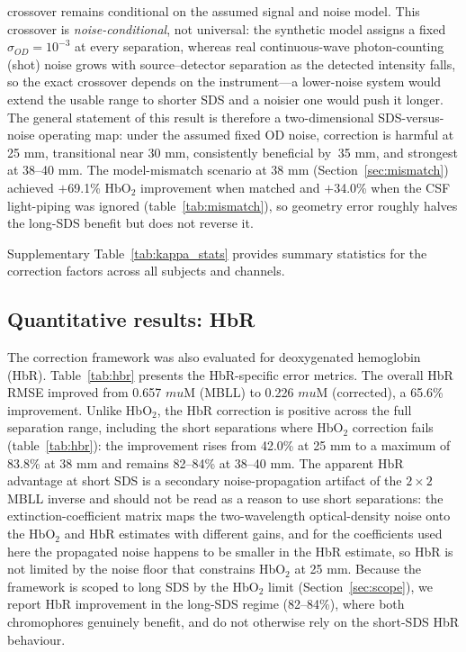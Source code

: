 \documentclass[11pt]{article}
\def\mu{mu}%
\def\sim{~}%
\def\mathrm#1{#1}%
\def\,{ }%
\begin{document}
crossover remains conditional on the assumed signal and noise model. This crossover is \emph{noise-conditional}, not universal: the synthetic model assigns a fixed $\sigma_{\mathrm{OD}}=10^{-3}$ at every separation, whereas real continuous-wave photon-counting (shot) noise grows with source--detector separation as the detected intensity falls, so the exact crossover depends on the instrument---a lower-noise system would extend the usable range to shorter SDS and a noisier one would push it longer. The general statement of this result is therefore a two-dimensional SDS-versus-noise operating map: under the assumed fixed OD noise, correction is harmful at 25\,mm, transitional near 30\,mm, consistently beneficial by $\sim$35\,mm, and strongest at 38--40\,mm. The model-mismatch scenario at 38\,mm (Section~\ref{sec:mismatch}) achieved $+$69.1\% HbO$_2$ improvement when matched and $+$34.0\% when the CSF light-piping was ignored (table~\ref{tab:mismatch}), so geometry error roughly halves the long-SDS benefit but does not reverse it.



Supplementary Table~\ref{tab:kappa_stats} provides summary statistics for the correction factors across all subjects and channels.



\subsection{Quantitative results: HbR}

The correction framework was also evaluated for deoxygenated hemoglobin (HbR). Table~\ref{tab:hbr} presents the HbR-specific error metrics. The overall HbR RMSE improved from 0.657\,$\mu$M (MBLL) to 0.226\,$\mu$M (corrected), a 65.6\% improvement. Unlike HbO$_2$, the HbR correction is positive across the full separation range, including the short separations where HbO$_2$ correction fails (table~\ref{tab:hbr}): the improvement rises from 42.0\% at 25\,mm to a maximum of 83.8\% at 38\,mm and remains 82--84\% at 38--40\,mm. The apparent HbR advantage at short SDS is a secondary noise-propagation artifact of the $2\times2$ MBLL inverse and should not be read as a reason to use short separations: the extinction-coefficient matrix maps the two-wavelength optical-density noise onto the HbO$_2$ and HbR estimates with different gains, and for the coefficients used here the propagated noise happens to be smaller in the HbR estimate, so HbR is not limited by the noise floor that constrains HbO$_2$ at 25\,mm. Because the framework is scoped to long SDS by the HbO$_2$ limit (Section~\ref{sec:scope}), we report HbR improvement in the long-SDS regime (82--84\%), where both chromophores genuinely benefit, and do not otherwise rely on the short-SDS HbR behaviour.
\end{document}
